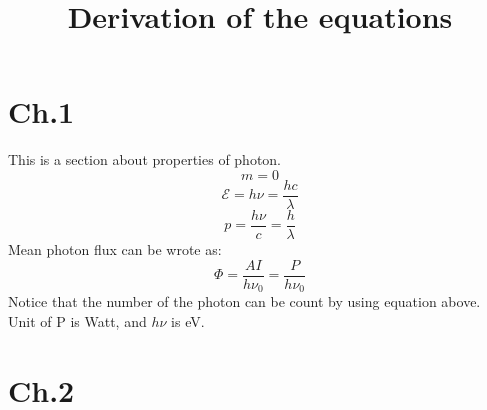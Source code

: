 \documentclass[9pt]{article}
\title{Derivation of the equations}
\date{}
\begin{document}
\maketitle
\section{Ch.1}
This is a section about properties of photon.
\begin{equation*}
    m=0
\end{equation*}
\begin{equation*}
    \mathscr{E}=h\nu=\frac{hc}{\lambda}
\end{equation*}
\begin{equation*}
    p=\frac{h\nu}{c} = \frac{h}{\lambda}
\end{equation*}
Mean photon flux can be wrote as:
\begin{equation*}
    \Phi=\frac{AI}{h\nu_0}=\frac{P}{h\nu_0}
\end{equation*}
Notice that the number of the photon can be count by using equation above. Unit of P is Watt, and $h\nu$ is eV.
\section{Ch.2}
\end{document}
